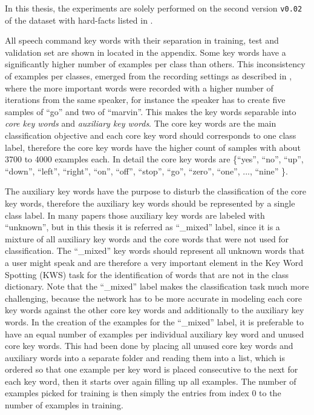 In this thesis, the experiments are solely performed on the second version \texttt{v0.02} of the dataset with hard-facts listed in .

All speech command key words with their separation in training, test and validation set are shown in  located in the appendix.
Some key words have a significantly higher number of examples per class than others.
This inconsistency of examples per classes, emerged from the recording settings as described in \cite{Warden2018}, where the more important words were recorded with a higher number of iterations from the same speaker, for instance the speaker has to create five samples of \enquote{go} and two of \enquote{marvin}.
This makes the key words separable into \emph{core key words} and \emph{auxiliary key words}.
The core key words are the main classification objective and each core key word should corresponds to one class label, therefore the core key words have the higher count of samples with about 3700 to 4000 examples each.
In detail the core key words are \{\enquote{yes}, \enquote{no}, \enquote{up}, \enquote{down}, \enquote{left}, \enquote{right}, \enquote{on}, \enquote{off}, \enquote{stop}, \enquote{go}, \enquote{zero}, \enquote{one}, ..., \enquote{nine} \}.

The auxiliary key words have the purpose to disturb the classification of the core key words, therefore the auxiliary key words should be represented by a single class label.
In many papers those auxiliary key words are labeled with \enquote{unknown}, but in this thesis it is referred as \enquote{\_mixed} label, since it is a mixture of all auxiliary key words and the core words that were not used for classification.
The \enquote{\_mixed} key words should represent all unknown words that a user might speak and are therefore a very important element in the Key Word Spotting (KWS) task for the identification of words that are not in the class dictionary.
Note that the \enquote{\_mixed} label makes the classification task much more challenging, because the network has to be more accurate in modeling each core key words against the other core key words and additionally to the auxiliary key words.
In the creation of the examples for the \enquote{\_mixed} label, it is preferable to have an equal number of examples per individual auxiliary key word and unused core key words.
This had been done by placing all unused core key words and auxiliary words into a separate folder and reading them into a list, which is ordered so that one example per key word is placed consecutive to the next for each key word, then it starts over again filling up all examples.
The number of examples picked for training is then simply the entries from index 0 to the number of examples in training. 

